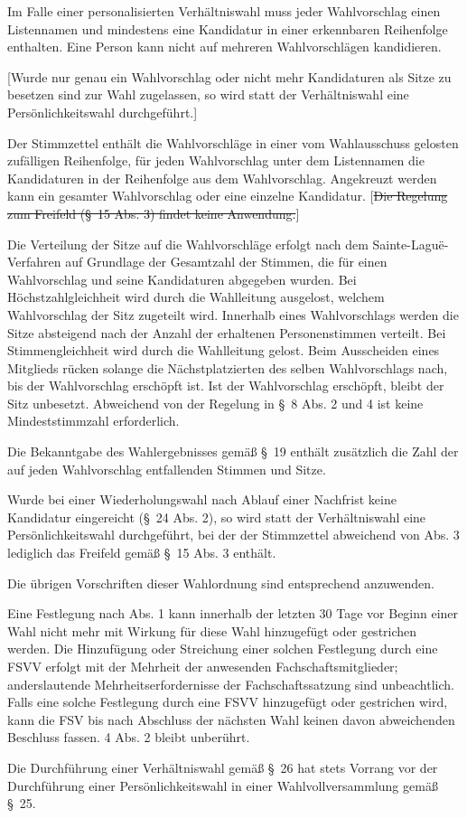 \documentclass[%
draft,%
multilinesections%
]{fswo}
\newcommand\oldT[1]  {{\color{Gray}[\st{#1}]}}
\newcommand\newT[1]  {{\color{Green}[#1]}}
\newcommand\oldT[1]{}%
\newcommand\newT[1]{#1}
\begin{document}
\begin{contract}
Im Falle einer personalisierten Verhältniswahl muss jeder Wahlvorschlag einen Listennamen und mindestens eine Kandidatur in einer erkennbaren Reihenfolge enthalten.
Eine Person kann nicht auf mehreren Wahlvorschlägen kandidieren.

\newT{Wurde nur genau ein Wahlvorschlag oder nicht mehr Kandidaturen als Sitze zu besetzen sind zur Wahl zugelassen, so wird statt der Verhältniswahl eine Persönlichkeitswahl durchgeführt.}

Der Stimmzettel enthält die Wahlvorschläge in einer vom Wahlausschuss gelosten zufälligen Reihenfolge, für jeden Wahlvorschlag unter dem Listennamen die Kandidaturen in der Reihenfolge aus dem Wahlvorschlag.
Angekreuzt werden kann ein gesamter Wahlvorschlag oder eine einzelne Kandidatur.
\oldT{Die Regelung zum Freifeld (\S~15 Abs. 3) findet keine Anwendung.}

Die Verteilung der Sitze auf die Wahlvorschläge erfolgt nach dem Sainte-Laguë-Verfahren auf Grundlage der Gesamtzahl der Stimmen, die für einen Wahlvorschlag und seine Kandidaturen abgegeben wurden.
Bei Höchstzahlgleichheit wird durch die Wahlleitung ausgelost, welchem Wahlvorschlag der Sitz zugeteilt wird.
Innerhalb eines Wahlvorschlags werden die Sitze absteigend nach der Anzahl der erhaltenen Personenstimmen verteilt.
Bei Stimmengleichheit wird durch die Wahlleitung gelost.
Beim Ausscheiden eines Mitglieds rücken solange die Nächstplatzierten des selben Wahlvorschlags nach, bis der Wahlvorschlag erschöpft ist.
Ist der Wahlvorschlag erschöpft, bleibt der Sitz unbesetzt.
Abweichend von der Regelung in \S~8 Abs. 2 und 4 ist keine Mindeststimmzahl erforderlich.

Die Bekanntgabe des Wahlergebnisses gemäß \S~19 enthält zusätzlich die Zahl der auf jeden Wahlvorschlag entfallenden Stimmen und Sitze.

Wurde bei einer Wiederholungswahl nach Ablauf einer Nachfrist keine Kandidatur eingereicht (\S~24 Abs. 2), so wird statt der Verhältniswahl eine Persönlichkeitswahl durchgeführt, bei der der Stimmzettel abweichend von Abs. 3 lediglich das Freifeld gemäß \S~15 Abs. 3 enthält.

Die übrigen Vorschriften dieser Wahlordnung sind entsprechend anzuwenden.

Eine Festlegung nach Abs. 1 kann innerhalb der letzten 30 Tage vor Beginn einer Wahl nicht mehr mit Wirkung für diese Wahl hinzugefügt oder gestrichen werden.
Die Hinzufügung oder Streichung einer solchen Festlegung durch eine FSVV erfolgt mit der Mehrheit der anwesenden Fachschaftsmitglieder; anderslautende Mehrheitserfordernisse der Fachschaftssatzung sind unbeachtlich.
Falls eine solche Festlegung durch eine FSVV hinzugefügt oder gestrichen wird, kann die FSV bis nach Abschluss der nächsten Wahl keinen davon abweichenden Beschluss fassen. 4 Abs. 2 bleibt unberührt.

Die Durchführung einer Verhältniswahl gemäß \S~26 hat stets Vorrang vor der Durchführung einer Persönlichkeitswahl in einer Wahlvollversammlung gemäß \S~25.
\end{contract}
\end{document}
